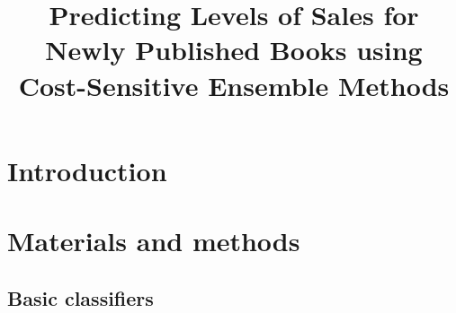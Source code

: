\documentclass{llncs}
\title{Predicting Levels of Sales for Newly Published Books using Cost-Sensitive Ensemble Methods}
\author {}
\institute{}
\date{}
\begin{document}
\maketitle

\begin{abstract}

\end{abstract}



\section{Introduction}


\section{Materials and methods}
\subsection{Basic classifiers}
\end{document}
